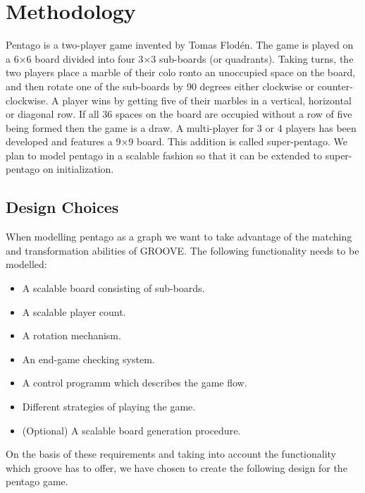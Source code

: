 \section{Methodology}
\label{Methodology}
Pentago is a two-player game invented by Tomas Flodén. The game is played on a 6×6 board divided into four 3×3 sub-boards (or quadrants). Taking turns, the two players place a marble of their colo ronto an unoccupied space on the board, and then rotate one of the sub-boards by 90 degrees either clockwise or counter-clockwise. A player wins by getting five of their marbles in a vertical, horizontal or diagonal row. If all 36 spaces on the board are occupied without a row of five being formed then the game is a draw. A multi-player for 3 or 4 players has been developed and features a 9×9 board. This addition is called super-pentago. We plan to model pentago in a scalable fashion so that it can be extended to super-pentago on initialization.

\subsection{Design Choices}
When modelling pentago as a graph we want to take advantage of the matching and transformation abilities of GROOVE. The following functionality needs to be modelled:
\begin{itemize}
	\item A scalable board consisting of sub-boards.
	\item A scalable player count.
	\item A rotation mechanism.
	\item An end-game checking system.
	\item A control programm which describes the game flow.
	\item Different strategies of playing the game.
	\item (Optional) A scalable board generation procedure.
\end{itemize}

On the basis of these requirements and taking into account the functionality which groove has to offer, we have chosen to create the following design for the pentago game.